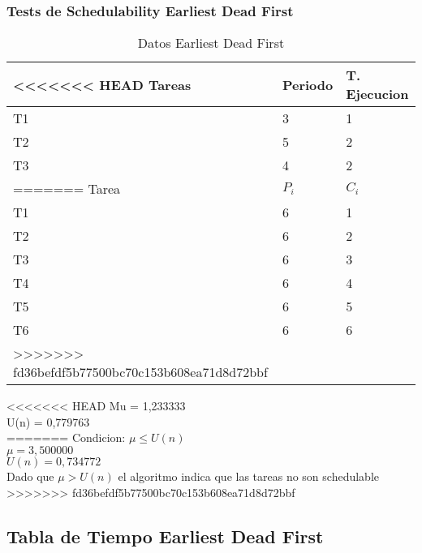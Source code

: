 \documentclass[xcolor=table]{beamer}
\begin{document}
\begin{frame} 
\frametitle{Tests de Schedulability  Earliest Dead First } 
\begin{table} 
\centering 
\begin{tabular}{|l|l|l|} 
\hline 
<<<<<<< HEAD
Tareas & Periodo & T. Ejecucion \\ \hline 
T1   & 3  &  1\\ \hline 
T2   & 5  &  2\\ \hline 
T3   & 4  &  2\\ \hline 
=======
\cellcolor{lightgray}Tarea & \cellcolor{lightgray}$P_i$ & \cellcolor{lightgray}$C_i$ \\ \hline 
T1   & 6  &  1\\ \hline 
T2   & 6  &  2\\ \hline 
T3   & 6  &  3\\ \hline 
T4   & 6  &  4\\ \hline 
T5   & 6  &  5\\ \hline 
T6   & 6  &  6\\ \hline 
>>>>>>> fd36befdf5b77500bc70c153b608ea71d8d72bbf
\end{tabular} 
\caption{Datos  Earliest Dead First } 
\end{table} 
<<<<<<< HEAD
Mu =  1,233333 \\ 
U(n) =  0,779763 \\ 
=======
Condicion: $\mu \leq U(n)$ \\ 
$\mu =  3,500000 $ \\ 
$U(n) =  0,734772 $ \\ 
Dado que $\mu>U(n)$ el algoritmo indica que las tareas no son schedulable \\ 
>>>>>>> fd36befdf5b77500bc70c153b608ea71d8d72bbf
\end{frame} 

\subsection{Tabla de Tiempo  Earliest Dead First } 
\end{document}

